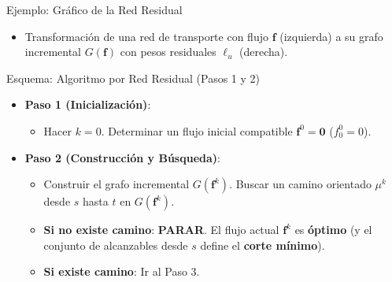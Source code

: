 \documentclass[
  ignorenonframetext,
]{beamer}
\providecommand{\tightlist}{%
  \setlength{\itemsep}{0pt}\setlength{\parskip}{0pt}}
\begin{document}
\begin{frame}{Ejemplo: Gráfico de la Red Residual}
\label{ejemplo-gruxe1fico-de-la-red-residual}
\begin{itemize}
\tightlist
\item
  Transformación de una red de transporte con flujo \(\mathbf{f}\)
  (izquierda) a su grafo incremental \(G(\mathbf{f})\) con pesos
  residuales \(\ell_u\) (derecha).
\end{itemize}
\end{frame}

\begin{frame}{Esquema: Algoritmo por Red Residual (Pasos 1 y 2)}
\label{esquema-algoritmo-por-red-residual-pasos-1-y-2}
\begin{itemize}
\tightlist
\item
  \textbf{Paso 1 (Inicialización)}:

  \begin{itemize}
  \tightlist
  \item
    Hacer \(k = 0\). Determinar un flujo inicial compatible
    \(\mathbf{f}^0 = \mathbf{0}\) (\(f_0^0 = 0\)).
  \end{itemize}
\item
  \textbf{Paso 2 (Construcción y Búsqueda)}:

  \begin{itemize}
  \tightlist
  \item
    Construir el grafo incremental \(G(\mathbf{f}^k)\). Buscar un camino
    orientado \(\mu^k\) desde \(s\) hasta \(t\) en \(G(\mathbf{f}^k)\).
  \item
    \textbf{Si no existe camino}: \textbf{PARAR}. El flujo actual
    \(\mathbf{f}^k\) es \textbf{óptimo} (y el conjunto de alcanzables
    desde \(s\) define el \textbf{corte mínimo}).
  \item
    \textbf{Si existe camino}: Ir al Paso 3.
  \end{itemize}
\end{itemize}
\end{frame}
\end{document}
